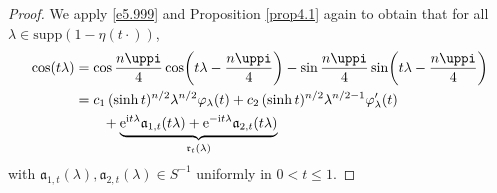 \documentclass[a4paper,12pt]{amsart}
\numberwithin{equation}{section}
\theoremstyle{definition}
\theoremstyle{remark}
\numberwithin{theorem}{section}
\newcommand{\e}{\mathrm{e}}
\newcommand{\supp}{\mathrm{supp}}
\renewcommand{\i}{\mathrm{i}}
\begin{document}
\begin{proof}
We apply \eqref{e5.999} and Proposition \ref{prop4.1} again to obtain that for all $\lambda\in\supp (1-\eta(t\cdot))$,
\begin{align}
\cos(t\lambda)&=\cos{n\uppi\over 4}\cos\!\left(t\lambda-{n\uppi\over 4}\right)-\sin{n\uppi\over 4}\sin\!\left(t\lambda-{n\uppi\over 4}\right)\notag\\
&=c_1\, (\sinh t)^{n/2}\lambda^{n/2}\varphi_\lambda(t)+c_2\,(\sinh t)^{n/2} \lambda^{n/2-1}\varphi_\lambda'(t)\nonumber \\
&\qquad+\underbrace{\e^{\i t\lambda}\mathfrak{a}_{1,t}(t\lambda)+\e^{-\i t\lambda}\mathfrak{a}_{2,t}(t\lambda)}_{\mathfrak{r}_t(\lambda)}\label{e5.5}
\end{align}
with $\mathfrak{a}_{1,t}(\lambda), \mathfrak{a}_{2,t}(\lambda)\in S^{-1}$ uniformly in $0<t\leq 1$.


\end{proof}
\end{document}
